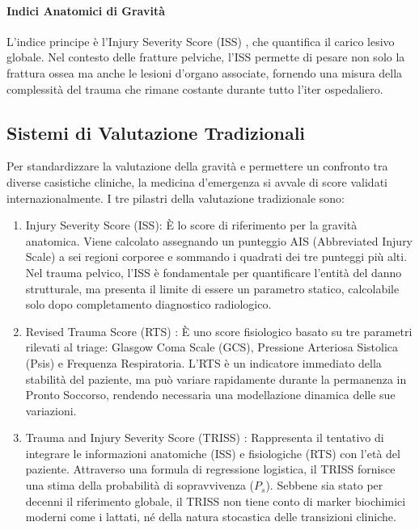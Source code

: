 \documentclass[11pt, oneside, noexaminfo]{sapthesis}   	%
\begin{document}
\paragraph{Indici Anatomici di Gravità}
L'indice principe è l'Injury Severity Score (ISS) \cite{baker1974iss}, che quantifica il carico lesivo globale. Nel contesto delle fratture pelviche, l'ISS permette di pesare non solo la frattura ossea ma anche le lesioni d'organo associate, fornendo una misura della complessità del trauma che rimane costante durante tutto l'iter ospedaliero.

\subsection{Sistemi di Valutazione Tradizionali}
Per standardizzare la valutazione della gravità e permettere un confronto tra diverse casistiche cliniche, la medicina d'emergenza si avvale di score validati internazionalmente. I tre pilastri della valutazione tradizionale sono:

\begin{enumerate}
\item {Injury Severity Score (ISS)}: È lo score di riferimento per la gravità {anatomica}. Viene calcolato assegnando un punteggio AIS (Abbreviated Injury Scale) a sei regioni corporee e sommando i quadrati dei tre punteggi più alti. Nel trauma pelvico, l'ISS è fondamentale per quantificare l'entità del danno strutturale, ma presenta il limite di essere un parametro statico, calcolabile solo dopo completamento diagnostico radiologico.

\item {Revised Trauma Score (RTS)} \cite{champion1989rts}: È uno score {fisiologico} basato su tre parametri rilevati al triage: Glasgow Coma Scale (GCS), Pressione Arteriosa Sistolica (Psis) e Frequenza Respiratoria. L'RTS è un indicatore immediato della stabilità del paziente, ma può variare rapidamente durante la permanenza in Pronto Soccorso, rendendo necessaria una modellazione dinamica delle sue variazioni.

\item {Trauma and Injury Severity Score (TRISS)} \cite{boyd1987triss}: Rappresenta il tentativo di integrare le informazioni anatomiche (ISS) e fisiologiche (RTS) con l'età del paziente. Attraverso una formula di regressione logistica, il TRISS fornisce una stima della probabilità di sopravvivenza ($P_s$). Sebbene sia stato per decenni il riferimento globale, il TRISS non tiene conto di marker biochimici moderni come i lattati, né della natura stocastica delle transizioni cliniche.
\end{enumerate}
\end{document}
